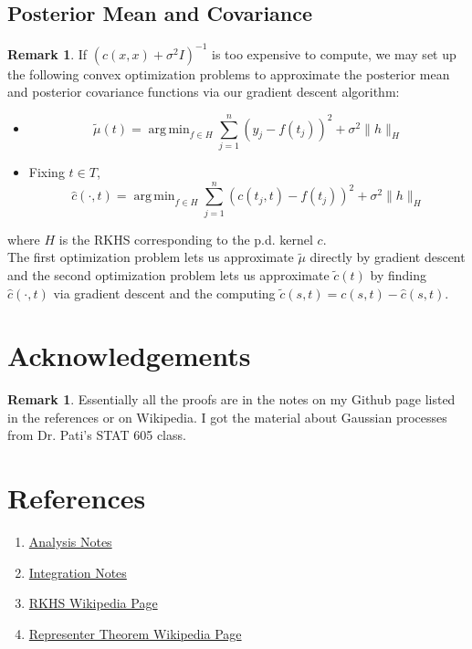 \documentclass[twoside]{article}
\theoremstyle{definition}
\theoremstyle{definition}
\newtheorem{rem}[definition]{Remark}
\newcommand{\sig}{\sigma}
\DeclareMathOperator*{\argmin}{arg\,min}
\begin{document}
\subsection{Posterior Mean and Covariance}
\begin{rem}
If $(c(x,x) + \sig^2I)^{-1}$ is too expensive to compute, we may set up the following convex optimization problems to approximate the posterior mean and posterior covariance functions via our gradient descent algorithm:
\begin{itemize}
\item $$\tilde{\mu}(t) = \argmin_{f \in H} \sum_{j=1}^n (y_j - f(t_j))^2 + \sig^2 \|h\|_H$$ 
\item Fixing $t \in T$, $$\hat{c}(\cdot, t) = \argmin_{f \in H} \sum_{j=1}^n (c(t_j, t) - f(t_j))^2 + \sig^2 \|h\|_H$$
\end{itemize}
where $H$ is the RKHS corresponding to the p.d. kernel $c$. \\
The first optimization problem lets us approximate $\tilde{\mu}$ directly by gradient descent and the second optimization problem lets us approximate $\tilde{c}(t)$ by finding $\hat{c}(\cdot, t)$ via gradient descent and the computing $\tilde{c}(s, t) = c(s, t) - \hat{c}(s, t)$.
\end{rem}

\section*{Acknowledgements}
\begin{rem}
Essentially all the proofs are in the notes on my Github page listed in the references or on Wikipedia. I got the material about Gaussian processes from Dr. Pati's STAT 605 class.  
\end{rem}

\section*{References}
\begin{enumerate}
\item \href{https://github.com/carsonaj/Mathematics/blob/master/Introduction\%20to\%20Analysis/Introduction\%20to\%20Analysis.pdf}{Analysis Notes}

\item \href{https://github.com/carsonaj/Mathematics/blob/master/Introduction\%20to\%20Measure\%20and\%20Integration/Introduction\%20to\%20Measure\%20and\%20Integration.pdf}{Integration Notes}

\item \href{https://en.wikipedia.org/wiki/Reproducing_kernel_Hilbert_space}{RKHS Wikipedia Page}

\item \href{https://en.wikipedia.org/wiki/Representer_theorem}{Representer Theorem Wikipedia Page}
\end{enumerate}
\end{document}
